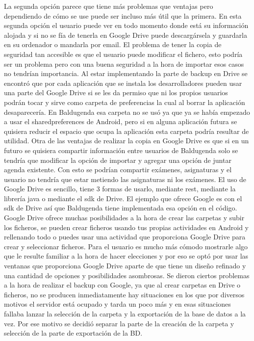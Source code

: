 La segunda opción parece que tiene más problemas que ventajas pero dependiendo de cómo se use puede ser incluso más útil que la primera. 
En esta segunda opción el usuario puede ver en todo momento donde está su información alojada y si no se fía de tenerla en Google Drive puede descargársela y guardarla en su ordenador o mandarla por email.
El problema de tener la copia de seguridad tan accesible es que el usuario puede modificar el fichero, esto podría ser un problema pero con una buena seguridad a la hora de importar esos casos no tendrían importancia.
Al estar implementando la parte de backup en Drive se encontró que por cada aplicación que se instala los desarrolladores pueden usar una parte del Google Drive si se les da permiso que ni los propios usuarios podrán tocar y sirve como carpeta de preferencias la cual al borrar la aplicación desaparecería.
En Baldugenda esa carpeta no se usó ya que ya se había empezado a usar el sharedpreferences de Android, pero si en alguna aplicación futura se quisiera reducir el espacio que ocupa la aplicación esta carpeta podría resultar de utilidad.
Otra de las ventajas de realizar la copia en Google Drive es que si en un futuro se quisiera compartir información entre usuarios de Baldugenda solo se tendría que modificar la opción de importar y agregar una opción de juntar agenda existente. Con esto se podrían compartir exámenes, asignaturas y el usuario no tendría que estar metiendo las asignaturas ni los exámenes.
El uso de Google Drive es sencillo, tiene 3 formas de usarlo, mediante rest, mediante la librería java o mediante el sdk de Drive.
El ejemplo que ofrece Google es con el sdk de Drive así que Baldugenda tiene implementada esa opción en el código.
Google Drive ofrece muchas posibilidades a la hora de crear las carpetas y subir los ficheros, se pueden crear ficheros usando tus propias actividades en Android y rellenando todo o puedes usar una actividad que proporciona Google Drive para crear y seleccionar ficheros.
Para el usuario es mucho más cómodo mostrarle algo que le resulte familiar a la hora de hacer elecciones y por eso se optó por usar las ventanas que proporciona Google Drive aparte de que tiene un diseño refinado y una cantidad de opciones y posibilidades asombrosas.
Se dieron ciertos problemas a la hora de realizar el backup con Google, ya que al crear carpetas en Drive o ficheros, no se producen inmediatamente hay situaciones en los que por diversos motivos el servidor está ocupado y tarda un poco más y en esas situaciones fallaba lanzar la selección de la carpeta y la exportación de la base de datos a la vez.
Por ese motivo se decidió separar la parte de la creación de la carpeta y selección de la parte de exportación de la BD.

